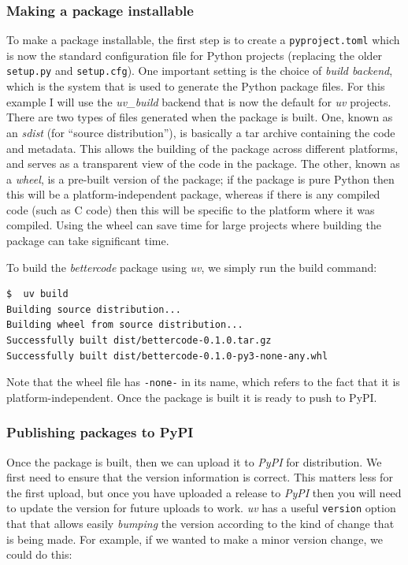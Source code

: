 \subsubsection{Making a package installable}

To make a package installable, the first step is to create a \texttt{pyproject.toml} which is now the standard configuration file for Python projects (replacing the older \texttt{setup.py} and \texttt{setup.cfg}).  One important setting is the choice of \textit{build backend}, which is the system that is used to generate the Python package files. For this example I will use the \textit{uv\_build} backend that is now the default for \textit{uv} projects.  There are two types of files generated when the package is built.  One, known as an \textit{sdist} (for ``source distribution''), is basically a tar archive containing the code and metadata.  This allows the building of the package across different platforms, and serves as a transparent view of the code in the package.  The other, known as a \textit{wheel}, is a pre-built version of the package; if the package is pure Python then this will be a platform-independent package, whereas if there is any compiled code (such as C code) then this will be specific to the platform where it was compiled.  Using the wheel can save time for large projects where building the package can take significant time.

To build the \textit{bettercode} package using \textit{uv}, we simply run the build command:

\begin{lstlisting}[style=shell]
$  uv build
Building source distribution...
Building wheel from source distribution...
Successfully built dist/bettercode-0.1.0.tar.gz
Successfully built dist/bettercode-0.1.0-py3-none-any.whl
\end{lstlisting}

Note that the wheel file has \texttt{-none-} in its name, which refers to the fact that it is platform-independent.  Once the package is built it is ready to push to PyPI.

\subsubsection{Publishing packages to PyPI}

Once the package is built, then we can upload it to \textit{PyPI} for distribution.  We first need to ensure that the version information is correct.  This matters less for the first upload, but once you have uploaded a release to \textit{PyPI} then you will need to update the version for future uploads to work.  \textit{uv} has a useful \texttt{version} option that that allows easily \textit{bumping} the version according to the kind of change that is being made. For example, if we wanted to make a minor version change, we could do this:

